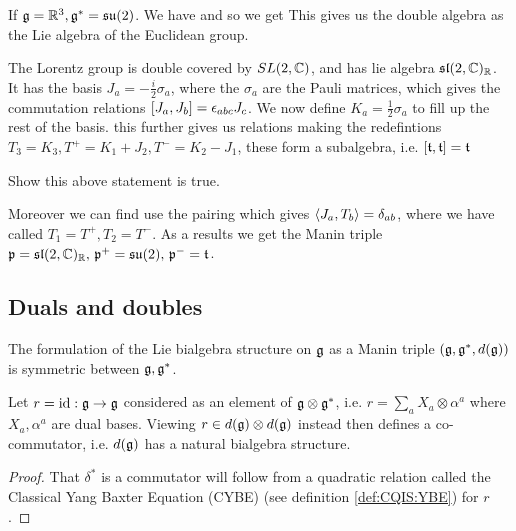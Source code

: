 \documentclass{article}
\begin{document}
\begin{example}
If $\mf{g} = \mbb{R}^3, \mf{g}^\ast = \mf{su}(2)$. We have 
and so we get  
This gives us the double algebra as the Lie algebra of the Euclidean group. 
\end{example}

\begin{example}
The Lorentz group is double covered by $SL(2,\mbb{C})$, and has lie algebra $\mf{sl}(2,\mbb{C})_\mbb{R}$. It has the basis $J_a = -\frac{i}{2}\sigma_a$, where the $\sigma_a$ are the Pauli matrices, which gives the commutation relations $\comm[J_a]{J_b} = \eps_{abc}J_c$. We now define $K_a = \frac{1}{2}\sigma_a$ to fill up the rest of the basis. this further gives us relations 
making the redefintions $T_3 = K_3, T^+  = K_1 + J_2, T^- = K_2 - J_1$, these form a subalgebra, i.e. $\comm[\mf{t}]{\mf{t}} = \mf{t}$

\begin{ex}
Show this above statement is true.
\end{ex}

Moreover we can find use the pairing 
which gives $\pangle{J_a,T_b} = \delta_{ab}$, where we have called $T_1 = T^+, T_2 = T^-$. As a results we get the Manin triple $\mf{p} = \mf{sl}(2,\mbb{C})_\mbb{R}, \, \mf{p}^+ = \mf{su}(2), \, \mf{p}^- = \mf{t}$. 
\end{example}

\subsection{Duals and doubles}
The formulation of the Lie bialgebra structure on $\mf{g}$ as a Manin triple $(\mf{g},\mf{g}^\ast,d(\mf{g}))$ is symmetric between $\mf{g}, \mf{g}^\ast$. 
\begin{prop}\label{prop:CQIS:naturalr}
Let $r=\id : \mf{g} \to \mf{g}$ considered as an element of $\mf{g} \otimes \mf{g}^\ast$, i.e. $r = \sum_a X_a \otimes \alpha^a$ where $X_a, \alpha^a$ are dual bases. Viewing $r\in d(\mf{g}) \otimes d(\mf{g})$ instead then 
defines a co-commutator, i.e. $d(\mf{g})$ has a natural bialgebra structure. 
\end{prop}
\begin{proof}
That $\delta^\ast$ is a commutator will follow from a quadratic relation called the Classical Yang Baxter Equation (CYBE) (see definition \ref{def:CQIS:YBE}) for $r$. 
\end{proof}
\end{document}
